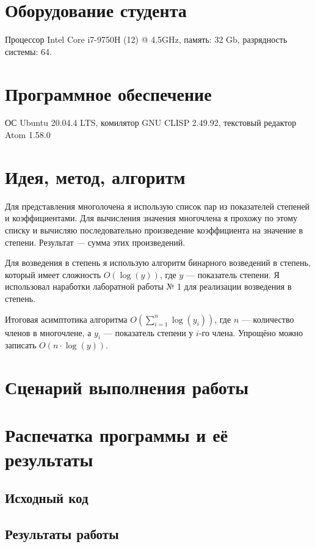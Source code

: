 \documentclass[12pt]{article}
\begin{document}
\section{Оборудование студента}
Процессор Intel Core i7-9750H (12) @ 4.5GHz, память: 32 Gb, разрядность системы: 64.

\section{Программное обеспечение}
ОС Ubuntu 20.04.4 LTS, комилятор GNU CLISP 2.49.92, текстовый редактор Atom 1.58.0

\pagebreak
\section{Идея, метод, алгоритм}
Для представления многолочена я использую список пар из показателей степеней и коэффициентами. Для вычисления значения многочлена я прохожу по этому списку и вычисляю последовательно произведение коэффициента на значение в степени. Результат --- сумма этих произведений.

Для возведения в степень я использую алгоритм бинарного возведений в степень, который имеет сложность $O(\log(y))$, где $y$ --- показатель степени. Я использовал наработки лаборатной работы № 1 для реализации возведения в степень.

Итоговая асимптотика алгоритма $O(\sum_{i = 1}^{n}{\log(y_i)})$, где $n$ --- количество членов в многочлене, а $y_i$ --- показатель степени у $i$-го члена. Упрощёно можно записать $O(n \cdot \log(y))$.

\section{Сценарий выполнения работы}

\section{Распечатка программы и её результаты}

\subsection{Исходный код}


\pagebreak
\subsection{Результаты работы}

\end{document}
